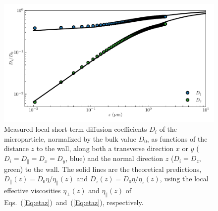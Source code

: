 \begin{figure}[H]
	\centering
	\includegraphics{02_body/chapter3/images/trajctory_analysis/visco.pdf}
	\caption{ Measured local short-term diffusion coefficients $D_i$ of the microparticle, normalized by the bulk value $D_0$, as functions of the distance $z$ to the wall, along both a transverse direction $x$ or $y$ ($D_i=D_\parallel=D_x=D_y$, blue) and the normal direction $z$ ($D_i=D_z$, green) to the wall. The solid lines are the theoretical predictions, $D_{\parallel}(z)=D_0\eta/\eta_{\parallel}(z)$ and $D_z(z)=D_0\eta/\eta_z(z)$, using the local effective viscosities $\eta_{\bot}(z)$ and $\eta_\parallel(z)$ of Eqs.~(\ref{Eq:etaz})~and~(\ref{Eq:etaz}), respectively.}
	\label{fig.visco}
\end{figure}

